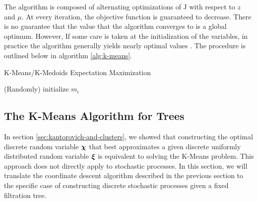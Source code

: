 The algorithm is composed of alternating optimizations of J with respect to $z$ and $\mu$.
At every iteration, the objective function is guaranteed to decrease.
There is no guarantee that the value that the algorithm converges to is a global optimum.
However, If some care is taken at the initialization of the variables, in practice the algorithm generally yields nearly optimal values \cite{Arthur2006}.
The procedure is outlined below in algorithm \ref{alg:k-means}.
\begin{algorithm}
  \label{alg:k-means}
  \caption{K-Means/K-Medoids Expectation Maximization}

  (Randomly) initialize $m_i$\;
\end{algorithm}
\subsection{The K-Means Algorithm for Trees}
\label{sec:k-means-algorithm-trees}
In section \ref{sec:kantorovich-and-clusters}, we showed that constructing the optimal discrete random variable $\boldsymbol\chi$ that best approximates a given discrete uniformly distributed random variable $\boldsymbol\xi$ is equivalent to solving the K-Means problem.
This approach does not directly apply to stochastic processes.
In this section, we will translate the coordinate descent algorithm described in the previous section to the specific case of constructing discrete stochastic processes given a fixed filtration tree.
